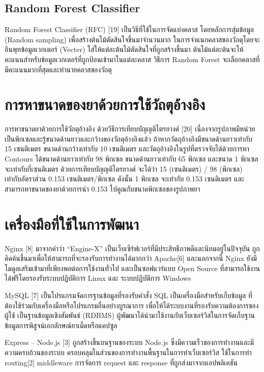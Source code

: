 	\subsection{Random Forest Classifier }
	Random Forest Classifier (RFC) [19] เป็นวิธีที่ใช้ในการจัดแบ่งคลาส โดยหลักการสุ่มข้อมูล (Random sampling) เพื่อสร้างต้นไม้ตัดสินใจขึ้นมาจำนวนมาก ในการจำแนกคลาสของวัถตุโดยจะอินพุทข้อมูลเวกเตอร์ (Vecter) ใส่ให้แต่ละต้นไม้ตัดสินใจที่ถูกสร้างขึ้นมา ต้นไม้แต่ละต้นจะให้คะแนนสำหรับข้อมูลเวกเตอร์ที่ถูกป้อนเข้ามาในแต่ละคลาส วิธีการ Random Forest จะเลือกคลาสที่มีคะแนนมากที่สุดและทำนายคลาสของวัถตุ


\section{การหาขนาดของยาด้วยการใช้วัถตุอ้างอิง}
	การหาขนาดยาด้วยการใช้วัถตุอ้างอิง ด้วยวิธีการเทียบบัญญติไตรยางศ์ [20] เนื่องจากรูปภาพมีหน่วยเป็นพิกเซลและรู้ขนาดด้านยาวและกว้างของวัถตุอ้างอิงแล้ว ถ้าหากวัตถุอ้างอิงมีขนาดด้านยาวเท่ากับ 15 เซนติเมตร ขนาดด้านกว้างเท่ากับ 10 เซนติเมตร และวัตถุอ้างอิงในรูปที่ตรวจจับได้ด้วยการหา Contours ได้ขนาดด้านยาวเท่ากับ 98 พิกเซล ขนาดด้านยาวเท่ากับ 65 พิกเซล และขนาด 1 พิกเซล จะเท่ากับกี่เซนติเมตร ด้วยการเทียบบัญญติไตรยางศ์ จะได้ว่า 15 (เซนติเมตร) / 98 (พิกเซล) เท่ากับอัตราส่วน 0.153 เซนติเมตร/พิกเซล ดังนั้น 1 พิกเซล จะเท่ากับ 0.153 เซนติเมตร และสามารถหาขนาดของยาด้วยการนำ 0.153 ไปคูณกับขนาดพิกเซลของรูปภาพยา

\section{เครื่องมือที่ใช้ในการพัฒนา}
	Nginx [8] มาจากคำว่า “Engine-X” เป็นเว็บเซิร์ฟเวอร์ที่มีประสิทธีภาพดีและนิยมอยู่ในปัจจุบัน ถูกคิดค้นขึ้นมาเพื่อให้สามารถที่จะรองรับการทำงานได้มากกว่า Apache[6] และนอกจากนี้ Nginx ยังมีโมดูลเสริมเข้ามาที่เพียงพอต่อการใช้งานทั่วไป และเป็นซอฟแวร์แบบ Open Source ที่สามารถใช้งานได้ฟรีโดยรองรับระบบปฏิบัติการ Linux และ ระบบปฏิบัติการ Windows
	
	MySQL [7] เป็นโปรแกรมจัดการฐานข้อมูลที่รองรับคำสั่ง SQL เป็นเครื่องมือสำหรับเก็บข้อมูล ที่ต้องใช้ร่วมกับเครื่องมือหรือโปรแกรมอื่นอย่างบูรณาการ เพื่อให้ได้ระบบงานที่รองรับความต้องการของผู้ใช้ เป็นฐานข้อมูลเชิงสัมพันธ์ (RDBMS) ผู้พัฒนาได้นำมาใช้งานกับเว็บเซอร์วิสในการจัดเก็บฐานข้อมูลการพิสูจน์เอกลักษณ์ยาเม็ดหรือแคปซูล
	
	Express – Node.js [3] ถูกสร้างขึ้นบนฐานของระบบ Node.js ซึ่งมีความเร็วของการทำงานและมีความครบถ้วนของระบบ ครอบคลุมในส่วนของการทำงานพื้นฐานในการทำเว็บเซอร์วิส ใช้ในการทำ routing[2] middleware การจัดการ request และ response ทื่ถูกส่งมาจากแอปพลิเคชัน

